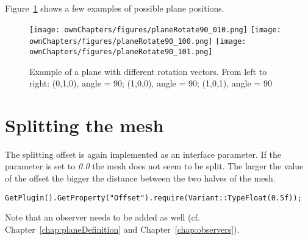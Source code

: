 Figure~\ref{fig:plane} shows a few examples of possible plane positions.
\begin{figure}%
\centering
\texttt{[image: ownChapters/figures/planeRotate90\_010.png]}%
\hspace{5.00mm}
\texttt{[image: ownChapters/figures/planeRotate90\_100.png]}%
\hspace{5.00mm}
\texttt{[image: ownChapters/figures/planeRotate90\_101.png]}%
\caption{Example of a plane with different rotation vectors. From left to right: (0,1,0), angle = 90; (1,0,0), angle = 90; (1,0,1), angle = 90}%
\label{fig:plane}%
\end{figure}

\section{Splitting the mesh}

The splitting offset is again implemented as an interface parameter. If the parameter is set to \emph{0.0} the mesh does not seem to be split. The larger the value of the offset the bigger the distance between the two halves of the mesh.
\begin{lstlisting}
GetPlugin().GetProperty("Offset").require(Variant::TypeFloat(0.5f));
\end{lstlisting}

Note that an observer needs to be added as well (cf. Chapter~\ref{chap:planeDefinition} and Chapter~\ref{chap:observers}).


